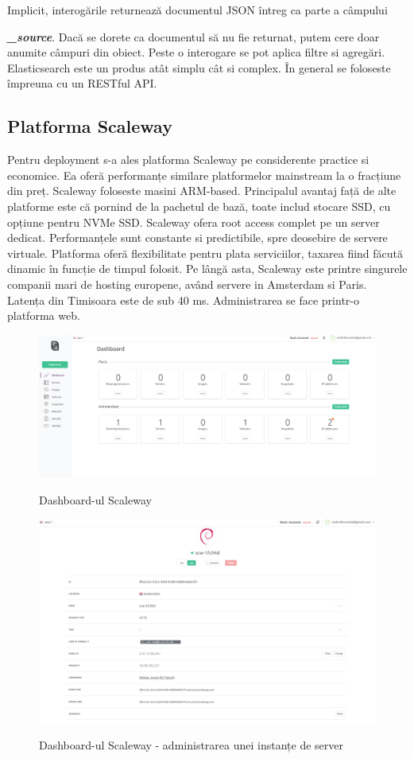 \documentclass[12pt]{report}
\begin{document}
Implicit, interogările returnează documentul JSON întreg ca parte a câmpului {\textbf{\textit{\_source}}. Dacă se dorete ca documentul să nu fie returnat, putem cere doar anumite câmpuri din obiect. Peste o interogare se pot aplica filtre si agregări. Elasticsearch este un produs atât simplu cât si complex. În general se foloseste împreuna cu un RESTful API.

	\subsection{Platforma Scaleway}
Pentru deployment s-a ales platforma Scaleway pe considerente practice si economice. Ea oferă performanțe similare platformelor mainstream la o fracțiune din preț. Scaleway foloseste masini ARM-based. Principalul avantaj față de alte platforme este că pornind de la pachetul de bază, toate includ stocare SSD, cu opțiune pentru NVMe SSD. Scaleway ofera root access complet pe un server dedicat. Performanțele sunt constante si predictibile, spre deosebire de servere virtuale. Platforma oferă flexibilitate pentru plata serviciilor, taxarea fiind făcută dinamic în funcție de timpul folosit. Pe lângă asta, Scaleway este printre singurele companii mari de hosting europene, având servere in Amsterdam si Paris. Latența din Timisoara este de sub 40 ms. Administrarea se face printr-o platforma web.
\begin{figure}[h]
	\centering
		{\includegraphics[width=170mm]{scaleway1.png}}
	\caption{Dashboard-ul Scaleway}
\end{figure}
\begin{figure}[h]
	\centering
		{\includegraphics[width=170mm]{scaleway2.png}}
	\caption{Dashboard-ul Scaleway - administrarea unei instanțe de server}
\end{figure}

}
\end{document}
